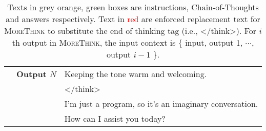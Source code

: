 \begin{table}[!t]
{\begin{tabular}{c r l  }
& \bf Output $N$ &  \colorbox{orange!20}{Keeping the tone warm and welcoming.} \\
& & \colorbox{orange!20}{</think>} \\
& & \colorbox{green!15}{I'm just a program, so it's an imaginary conversation. }  \\
& & \colorbox{green!15}{How can I assist you today? } \\ \bottomrule
    \end{tabular}
    }
    \caption{Texts in \colorbox{gray!15}{grey} \colorbox{orange!20}{orange}, \colorbox{green!15}{green} boxes are instructions, Chain-of-Thoughts and answers respectively.  Text in \textcolor{red}{red} are enforced replacement text for \textsc{MoreThink} to substitute the end of thinking tag (i.e., </think>). For $i$th output in \textsc{MoreThink}, the input context is \{ input, output 1, $\cdots$, output $i-1$ \}.}
    \label{tab:thinking-setup}
\end{table}